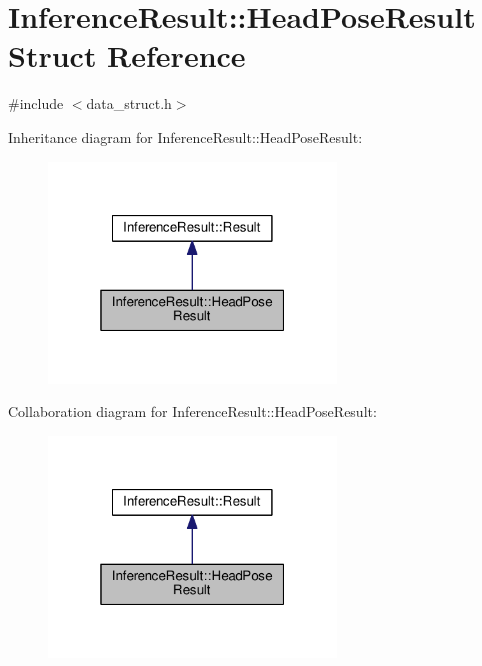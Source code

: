 \hypertarget{structInferenceResult_1_1HeadPoseResult}{}\section{Inference\+Result\+:\+:Head\+Pose\+Result Struct Reference}
\label{structInferenceResult_1_1HeadPoseResult}


{\ttfamily \#include $<$data\+\_\+struct.\+h$>$}



Inheritance diagram for Inference\+Result\+:\+:Head\+Pose\+Result\+:
\nopagebreak
\begin{figure}[H]
\begin{center}
\leavevmode
\includegraphics[width=217pt]{structInferenceResult_1_1HeadPoseResult__inherit__graph}
\end{center}
\end{figure}


Collaboration diagram for Inference\+Result\+:\+:Head\+Pose\+Result\+:
\nopagebreak
\begin{figure}[H]
\begin{center}
\leavevmode
\includegraphics[width=217pt]{structInferenceResult_1_1HeadPoseResult__coll__graph}
\end{center}
\end{figure}
